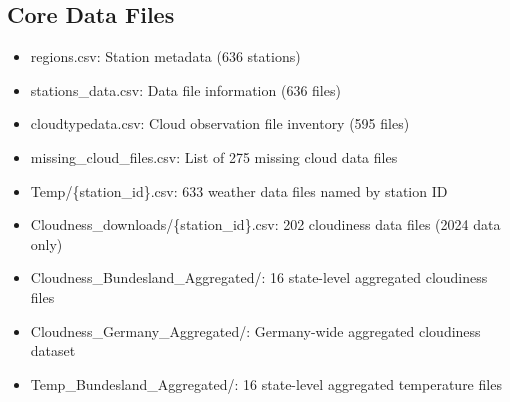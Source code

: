 \documentclass[11pt,a4paper]{article}
\begin{document}
\subsection{Core Data Files}
\begin{itemize}
    \item regions.csv: Station metadata (636 stations)
    \item stations\_data.csv: Data file information (636 files)
    \item cloudtypedata.csv: Cloud observation file inventory (595 files)
    \item missing\_cloud\_files.csv: List of 275 missing cloud data files
    \item Temp/\{station\_id\}.csv: 633 weather data files named by station ID
    \item Cloudness\_downloads/\{station\_id\}.csv: 202 cloudiness data files (2024 data only)
    \item Cloudness\_Bundesland\_Aggregated/: 16 state-level aggregated cloudiness files
    \item Cloudness\_Germany\_Aggregated/: Germany-wide aggregated cloudiness dataset
    \item Temp\_Bundesland\_Aggregated/: 16 state-level aggregated temperature files
\end{itemize}
\end{document}

